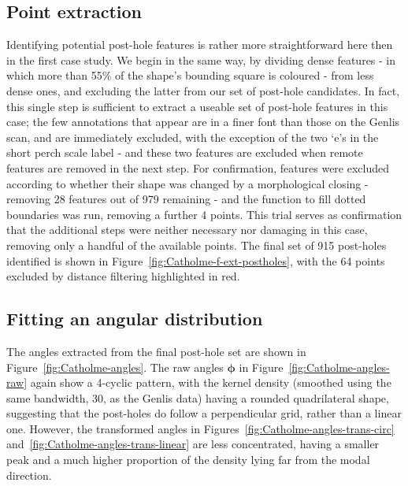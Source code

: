 \documentclass[../../ArchStats.tex]{subfiles}
\begin{document}
\subsection{Point extraction}
Identifying potential post-hole features is rather more straightforward here then in the first case study. We begin in the same way, by dividing dense features - in which more than 55\% of the shape's bounding square is coloured - from less dense ones, and excluding the latter from our set of post-hole candidates. In fact, this single step is sufficient to extract a useable set of post-hole features in this case; the few annotations that appear are in a finer font than those on the Genlis scan, and are immediately excluded, with the exception of the two `e's in the short perch scale label - and these two features are excluded when remote features are removed in the next step. For confirmation, features were excluded according to whether their shape was changed by a morphological closing - removing 28 features out of 979 remaining - and the function to fill dotted boundaries was run, removing a further 4 points. This trial serves as confirmation that the additional steps were neither necessary nor damaging in this case, removing only a handful of the available points. The final set of 915 post-holes identified is shown in Figure~\ref{fig:Catholme-f-ext-postholes}, with the 64 points excluded by distance filtering highlighted in red.




\subsection{Fitting an angular distribution}

The angles extracted from the final post-hole set are shown in Figure~\ref{fig:Catholme-angles}. The raw angles $\boldsymbol{\phi}$ in Figure~\ref{fig:Catholme-angles-raw} again show a 4-cyclic pattern, with the kernel density (smoothed using the same bandwidth, 30, as the Genlis data) having a rounded quadrilateral shape, suggesting that the post-holes do follow a perpendicular grid, rather than a linear one. However, the transformed angles in Figures~\ref{fig:Catholme-angles-trans-circ} and~\ref{fig:Catholme-angles-trans-linear} are less concentrated, having a smaller peak and a much higher proportion of the density lying far from the modal direction.
\end{document}
